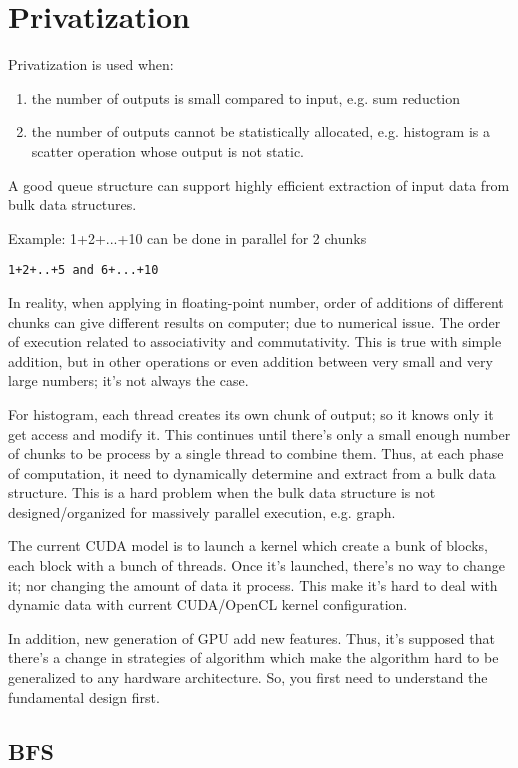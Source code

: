 \section{Privatization}
\label{sec:privatization}

Privatization is used when:
\begin{enumerate}
\item the number of outputs is small compared to input, e.g. sum reduction
\item the number of outputs cannot be statistically allocated,
  e.g. histogram is a scatter operation whose output is not static. 
\end{enumerate}
A good queue structure can support highly efficient extraction of
input data from bulk data structures.

Example: 1+2+...+10 can be done in parallel for 2 chunks
\begin{verbatim}
1+2+..+5 and 6+...+10
\end{verbatim}
In reality, when applying in floating-point number, order of additions
of different chunks can give different results on computer; due to
numerical issue. The order of execution related to associativity and
commutativity. This is true with simple addition, but in other
operations or even addition between very small and very large numbers;
it's not always the case.


For histogram, each thread creates its own chunk of output; so it
knows only it get access and modify it. This continues until there's
only a small enough number of chunks to be process by a single thread
to combine them. Thus, at each phase of computation, it need to
dynamically determine and extract from a bulk data structure. This is
a hard problem when the bulk data structure is not designed/organized
for massively parallel execution, e.g. graph. 


The current CUDA model is to launch a kernel which create a bunk of
blocks, each block with a bunch of threads. Once it's launched,
there's no way to change it; nor changing the amount of data it
process. This make it's hard to deal with dynamic data with current
CUDA/OpenCL kernel configuration. 


In addition, new generation of GPU add new features. Thus, it's
supposed that there's a change in strategies of algorithm which make
the algorithm hard to be generalized to any hardware architecture. So,
you first need to understand the fundamental design first. 

\subsection{BFS}
\label{sec:bfs}

